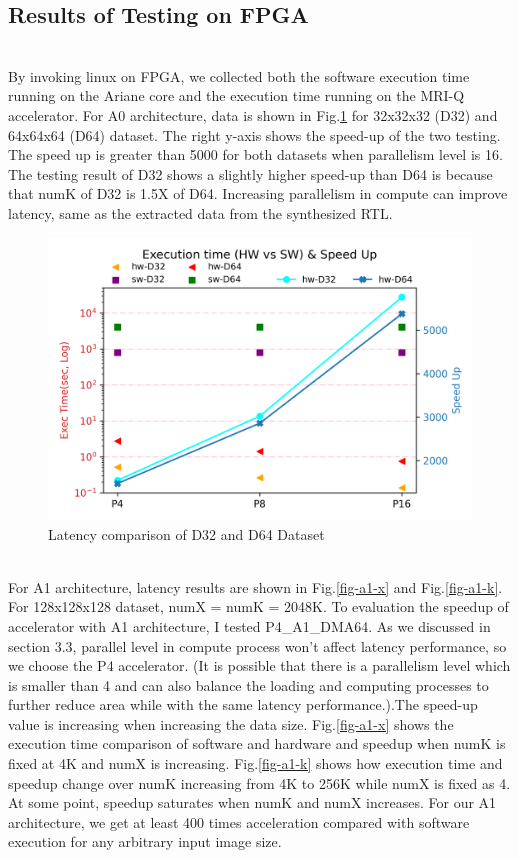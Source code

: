\documentclass{sig-alternate}
\begin{document}
\subsection{Results of Testing on FPGA}
\\
By invoking linux on FPGA, we collected both the software execution time running on the Ariane core and the execution time running on the MRI-Q accelerator. For A0 architecture, data is shown in Fig.\ref{fig-d32-64} for 32x32x32 (D32) and 64x64x64 (D64) dataset.  The right y-axis shows the speed-up of the two testing. The speed up is greater than 5000 for both datasets when parallelism level is 16. The testing result of D32 shows a slightly higher speed-up than D64 is because that numK of D32 is 1.5X of D64. Increasing parallelism in compute can improve latency, same as the extracted data from the synthesized RTL.\\

\begin{figure}[h!]
    \centering
    \includegraphics[width=\columnwidth]{figure/a0-both.png}
    \caption{Latency comparison of D32 and D64 Dataset}
    \label{fig-d32-64}
\end{figure}
\\
For A1 architecture, latency results are shown in Fig.\ref{fig-a1-x} and Fig.\ref{fig-a1-k}. For 128x128x128 dataset, numX = numK = 2048K. To evaluation the speedup of accelerator with A1 architecture, I tested P4\_A1\_DMA64. As we discussed in section 3.3, parallel level in compute process won't affect latency performance, so we choose the P4 accelerator. (It is possible that there is a parallelism level which is smaller than 4 and can also balance the loading and computing processes to further reduce area while with the same latency performance.).The speed-up value is increasing when increasing the data size. Fig.\ref{fig-a1-x} shows the execution time comparison of software and hardware and speedup when numK is fixed at 4K and numX is increasing. Fig.\ref{fig-a1-k} shows how execution time and speedup change over numK increasing from 4K to 256K while numX is fixed as 4.  At some point, speedup saturates when numK and numX increases. For our A1 architecture, we get at least 400 times acceleration compared with software execution for any arbitrary input image size.\\
\end{document}
